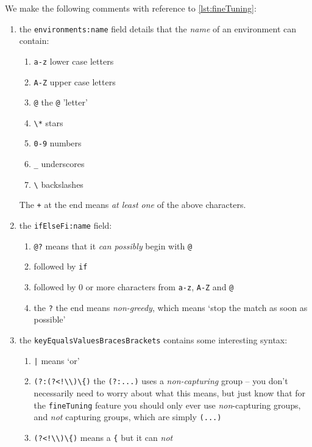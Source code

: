  We make the following comments with reference to \cref{lst:fineTuning}:
 \begin{enumerate}
	 \item the \texttt{environments:name} field details that the \emph{name} of an
	       environment can contain:
	       \begin{enumerate}
		       \item \texttt{a-z} lower case letters
		       \item \texttt{A-Z} upper case letters
		       \item \texttt{@} the \texttt{@} 'letter'
		       \item \lstinline!\*! stars
		       \item \texttt{0-9} numbers
		       \item \lstinline!_! underscores
		       \item \lstinline!\! backslashes
	       \end{enumerate}
	       The \texttt{+} at the end means \emph{at least one} of the above
	       characters.
	 \item the \texttt{ifElseFi:name} field:
	       \begin{enumerate}
		       \item \lstinline^@?^ means that it \emph{can possibly} begin with
		             \lstinline^@^
		       \item followed by \texttt{if}
		       \item followed by 0 or more characters from \texttt{a-z}, \texttt{A-Z} and
		             \texttt{@}
		       \item the \texttt{?} the end means \emph{non-greedy}, which means `stop the
		             match as soon as possible'
	       \end{enumerate}
	 \item the \texttt{keyEqualsValuesBracesBrackets} contains some interesting syntax:
	       \begin{enumerate}
		       \item \lstinline!|! means `or'
		       \item \lstinline^(?:(?<!\\)\{)^ the \lstinline^(?:...)^ uses a \emph{non-capturing} group --
		             you don't necessarily need to worry about what this means, but just know that for the
		             \texttt{fineTuning} feature you should only ever use \emph{non}-capturing
		             groups, and \emph{not} capturing groups, which are simply
		             \lstinline!(...)!
		       \item \lstinline^(?<!\\)\{)^ means a \lstinline^{^ but it can \emph{not}

\end{enumerate}
\end{enumerate}
